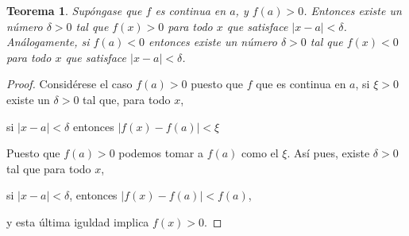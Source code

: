 \documentclass{article}
\theoremstyle{plain}
\newtheorem{theorem}{Teorema }[section]
\begin{document}
\begin{theorem}
Supóngase que \( f \) es continua en \( a \), y \( f(a) > 0 \). Entonces existe un número \( \delta > 0 \) tal que \( f(x) > 0 \) para todo \( x \) que satisface \( |x - a| < \delta \). Análogamente, si \( f(a) < 0 \) entonces existe un número \( \delta > 0 \) tal que \( f(x) < 0 \) para todo \( x \) que satisface \( |x - a| < \delta \).
\end{theorem}
\begin{proof}
Considérese el caso \(f(a)>0\) puesto que \(f\) que es continua en \(a\), si \(\xi>0\) existe un 
\(\delta>0\) tal que, para todo \(x\),
\begin{center}
   si \(|x - a| < \delta\) entonces \(|f(x) - f(a)| < \xi\)
   \end{center}
Puesto que \(f(a)>0\) podemos tomar a \(f(a)\) como el \(\xi\). Así pues, existe \(\delta>0\) tal que para todo \(x\),
\begin{center}
    si \(|x - a| < \delta\), entonces \(|f(x) - f(a)| < f(a)\),
\end{center}
y esta última iguldad implica \(f(x)>0\).
\end{proof}
\end{document}
